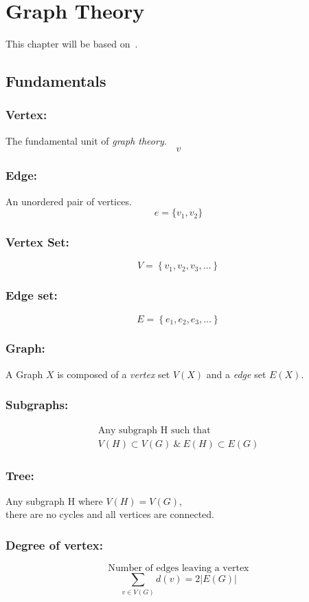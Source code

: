 \documentclass[../../mathematics_cheat_sheet.tex]{subfiles}
\begin{document}
\chapter{Graph Theory}
This chapter will be based on~\citet{GodsilRoyle2001}\cite{GodsilRoyle2001}.
\section{Fundamentals}
\subsection{Vertex:}
The fundamental unit of \emph{graph theory}.
\[v\]
\subsection{Edge:}
An unordered pair of vertices.
\[e=\{v_{1},v_{2}\}\]
\subsection{Vertex Set:}
\[
  V=\left\{v_{1}, v_{2}, v_{3}, \ldots\right\}
\]
\subsection{Edge set:}
\[
  E=\left\{e_{1}, e_{2}, e_{3}, \ldots\right\}
\]
\subsection{Graph:}
A Graph $X$ is composed of a \emph{vertex} set $V(X)$ and a \emph{edge} set $E(X)$.
\subsection{Subgraphs:}
\[
  \begin{array}{cc}
    \text{Any subgraph } \mathrm{H} \text{ such that}\\
    V(H) \subset V(G) ~\&~ E(H) \subset E(G)
  \end{array}
\]
\subsection{Tree:}
\begin{center}
  Any subgraph $\mathrm{H}$ where $V(H)=V(G)$,\\ there are no cycles and all vertices are connected.
\end{center}
%
\subsection{Degree of vertex:}
\[\text{Number of edges leaving a vertex}\]
\[\sum_{v \in V(G)} d(v)=2|E(G)| \]
%
%
\end{document}
